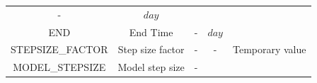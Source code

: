 \documentclass[]{scrbook}
\begin{document}
\begin{longtable}[]{@{}ccccc@{}}
\begin{minipage}[t]{0.10\columnwidth}
-\strut
\end{minipage} & \begin{minipage}[t]{0.10\columnwidth}\centering\strut
\(day\)\strut
\end{minipage} & \begin{minipage}[t]{0.26\columnwidth}\centering\strut
\strut
\end{minipage}\tabularnewline
\begin{minipage}[t]{0.17\columnwidth}\centering\strut
END\strut
\end{minipage} & \begin{minipage}[t]{0.23\columnwidth}\centering\strut
End Time\strut
\end{minipage} & \begin{minipage}[t]{0.10\columnwidth}\centering\strut
-\strut
\end{minipage} & \begin{minipage}[t]{0.10\columnwidth}\centering\strut
\(day\)\strut
\end{minipage} & \begin{minipage}[t]{0.26\columnwidth}\centering\strut
\strut
\end{minipage}\tabularnewline
\begin{minipage}[t]{0.17\columnwidth}\centering\strut
STEPSIZE\_FACTOR\strut
\end{minipage} & \begin{minipage}[t]{0.23\columnwidth}\centering\strut
Step size factor\strut
\end{minipage} & \begin{minipage}[t]{0.10\columnwidth}\centering\strut
-\strut
\end{minipage} & \begin{minipage}[t]{0.10\columnwidth}\centering\strut
-\strut
\end{minipage} & \begin{minipage}[t]{0.26\columnwidth}\centering\strut
Temporary value\strut
\end{minipage}\tabularnewline
\begin{minipage}[t]{0.17\columnwidth}\centering\strut
MODEL\_STEPSIZE\strut
\end{minipage} & \begin{minipage}[t]{0.23\columnwidth}\centering\strut
Model step size\strut
\end{minipage} & \begin{minipage}[t]{0.10\columnwidth}\centering\strut
-\strut
\end{minipage} & \begin{minipage}[t]{0.10\columnwidth}\centering\strut

\end{minipage}
\end{longtable}
\end{document}
